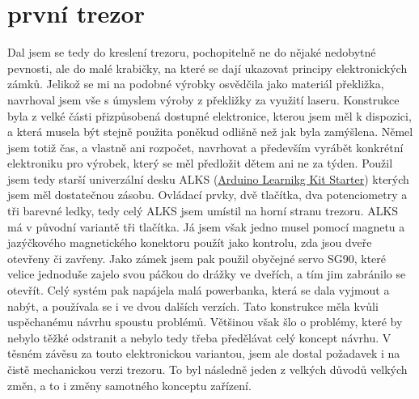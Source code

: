 \section*{první trezor}

Dal jsem se tedy do kreslení trezoru, pochopitelně ne do nějaké nedobytné pevnosti, ale do malé
krabičky, na které se dají ukazovat principy elektronických zámků. Jelikož se mi na podobné
výrobky osvědčila jako materiál překližka, navrhoval jsem vše s úmyslem výroby z překližky 
za využití laseru. Konstrukce byla z velké části přizpůsobená dostupné elektronice, kterou 
jsem měl k dispozici, a která musela být stejně použita poněkud odlišně než jak byla zamýšlena.
Němel jsem totiž čas, a vlastně ani rozpočet, navrhovat a především vyrábět konkrétní elektroniku
pro výrobek, který se měl předložit dětem ani ne za týden. Použil jsem tedy starší univerzální 
desku ALKS (\href{https://github.com/RoboticsBrno/ArduinoLearningKitStarter}{Arduino Learnikg Kit Starter})
kterých jsem měl dostatečnou zásobu. Ovládací prvky, dvě tlačítka, dva potenciometry a tři
barevné ledky, tedy celý ALKS jsem umístil na horní stranu trezoru. ALKS má v původní variantě
tři tlačítka. Já jsem však jedno musel pomocí magnetu a jazýčkového magnetického konektoru použít
jako kontrolu, zda jsou dveře otevřeny či zavřeny. Jako zámek jsem pak použil obyčejné servo
SG90, které velice jednoduše zajelo svou páčkou do drážky ve dveřích, a tím jim zabránilo 
se otevřít. Celý systém pak napájela malá powerbanka, která se dala vyjmout a nabýt, 
a používala se i ve dvou dalších verzích. Tato konstrukce měla kvůli uspěchanému návrhu 
spoustu problémů. Většinou však šlo o problémy, které by nebylo těžké odstranit a nebylo
tedy třeba předělávat celý koncept návrhu. V těsném závěsu za touto elektronickou variantou,
jsem ale dostal požadavek i na čistě mechanickou verzi trezoru. To byl následně jeden z 
velkých důvodů velkých změn, a to i změny samotného konceptu zařízení.

\newpage